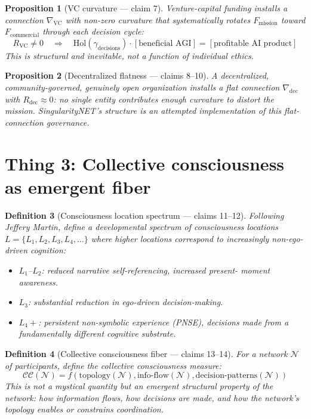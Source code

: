 \documentclass[11pt,a4paper]{article}
\newtheorem{definition}{Definition}[section]
\newtheorem{proposition}[definition]{Proposition}
\begin{document}
\begin{proposition}[VC curvature --- claim 7]
\label{prop:vc-curvature}
Venture-capital funding installs a connection $\nabla_{\text{VC}}$ with
non-zero curvature that systematically rotates $F_{\text{mission}}$
toward $F_{\text{commercial}}$ through each decision cycle:
\[
  R_{\text{VC}} \neq 0 \quad \Rightarrow \quad
  \mathrm{Hol}(\gamma_{\text{decisions}}) \cdot [\text{beneficial AGI}]
  = [\text{profitable AI product}]
\]
This is structural and inevitable, not a function of individual ethics.
\end{proposition}

\begin{proposition}[Decentralized flatness --- claims 8--10]
\label{prop:decentral}
A decentralized, community-governed, genuinely open organization installs
a flat connection $\nabla_{\text{dec}}$ with $R_{\text{dec}} \approx 0$:
no single entity contributes enough curvature to distort the mission.
SingularityNET's structure is an attempted implementation of this
flat-connection governance.
\end{proposition}

\section{Thing 3: Collective consciousness as emergent fiber}
\label{sec:thing3}

\begin{definition}[Consciousness location spectrum --- claims 11--12]
\label{def:pnse}
Following Jeffery Martin, define a developmental spectrum of consciousness
locations $L = \{L_1, L_2, L_3, L_4, \ldots\}$ where higher locations
correspond to increasingly non-ego-driven cognition:
\begin{itemize}
\item $L_1$--$L_2$: reduced narrative self-referencing, increased present-
  moment awareness.
\item $L_3$: substantial reduction in ego-driven decision-making.
\item $L_4+$: persistent non-symbolic experience (PNSE), decisions made
  from a fundamentally different cognitive substrate.
\end{itemize}
\end{definition}

\begin{definition}[Collective consciousness fiber --- claims 13--14]
\label{def:collective}
For a network $\mathcal{N}$ of participants, define the collective
consciousness measure:
\[
  \mathcal{CC}(\mathcal{N}) = f(\text{topology}(\mathcal{N}),
    \text{info-flow}(\mathcal{N}), \text{decision-patterns}(\mathcal{N}))
\]
This is \emph{not} a mystical quantity but an emergent structural property
of the network: how information flows, how decisions are made, and how
the network's topology enables or constrains coordination.
\end{definition}
\end{document}
